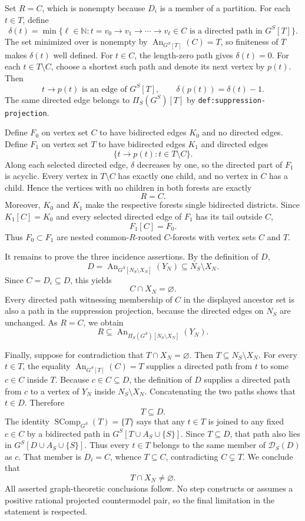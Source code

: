 Set \(R=C\), which is nonempty because \(D_i\) is a member of a partition.  For each \(t\in T\), define
\[
 \delta(t)=\min\bigl\{\ell\in\mathbb N:
 t=v_0\to v_1\to\cdots\to v_\ell\in C
 \text{ is a directed path in }G^S[T]\bigr\}.
\]
The set minimized over is nonempty by \(\operatorname{An}_{G^S[T]}(C)=T\), so finiteness of \(T\) makes \(\delta(t)\) well defined.  For \(t\in C\), the length-zero path gives \(\delta(t)=0\).  For each \(t\in T\setminus C\), choose a shortest such path and denote its next vertex by \(p(t)\).  Then
\[
 t\to p(t)\text{ is an edge of }G^S[T],
 \qquad
 \delta(p(t))=\delta(t)-1.
\]
The same directed edge belongs to \(\Pi_S(G^S)[T]\) by \texttt{def:suppression-projection}.

Define \(F_0\) on vertex set \(C\) to have bidirected edges \(K_0\) and no directed edges.  Define \(F_1\) on vertex set \(T\) to have bidirected edges \(K_1\) and directed edges
\[
 \{t\to p(t):t\in T\setminus C\}.
\]
Along each selected directed edge, \(\delta\) decreases by one, so the directed part of \(F_1\) is acyclic.  Every vertex in \(T\setminus C\) has exactly one child, and no vertex in \(C\) has a child.  Hence the vertices with no children in both forests are exactly
\[
 R=C.
\]
Moreover, \(K_0\) and \(K_1\) make the respective forests single bidirected districts.  Since \(K_1[C]=K_0\) and every selected directed edge of \(F_1\) has its tail outside \(C\),
\[
 F_1[C]=F_0.
\]
Thus \(F_0\subset F_1\) are nested common-\(R\)-rooted \(C\)-forests with vertex sets \(C\) and \(T\).

It remains to prove the three incidence assertions.  By the definition of \(D\),
\[
 D=\operatorname{An}_{G^S[N_S\setminus X_N]}(Y_N)
 \subseteq N_S\setminus X_N.
\]
Since \(C=D_i\subseteq D\), this yields
\[
 C\cap X_N=\varnothing.
\]
Every directed path witnessing membership of \(C\) in the displayed ancestor set is also a path in the suppression projection, because the directed edges on \(N_S\) are unchanged.  As \(R=C\), we obtain
\[
 R\subseteq
 \operatorname{An}_{\Pi_S(G^S)[N_S\setminus X_N]}(Y_N).
\]

Finally, suppose for contradiction that \(T\cap X_N=\varnothing\).  Then \(T\subseteq N_S\setminus X_N\).  For every \(t\in T\), the equality \(\operatorname{An}_{G^S[T]}(C)=T\) supplies a directed path from \(t\) to some \(c\in C\) inside \(T\).  Because \(c\in C\subseteq D\), the definition of \(D\) supplies a directed path from \(c\) to a vertex of \(Y_N\) inside \(N_S\setminus X_N\).  Concatenating the two paths shows that \(t\in D\).  Therefore
\[
 T\subseteq D.
\]
The identity \(\operatorname{SComp}_{G^S}(T)=\{T\}\) says that any \(t\in T\) is joined to any fixed \(c\in C\) by a bidirected path in \(G^S[T\cup A_S\cup\{S\}]\).  Since \(T\subseteq D\), that path also lies in \(G^S[D\cup A_S\cup\{S\}]\).  Thus every \(t\in T\) belongs to the same member of \(\mathcal D_S(D)\) as \(c\).  That member is \(D_i=C\), whence \(T\subseteq C\), contradicting \(C\subsetneq T\).  We conclude that
\[
 T\cap X_N\ne\varnothing.
\]
All asserted graph-theoretic conclusions follow.  No step constructs or assumes a positive rational projected countermodel pair, so the final limitation in the statement is respected.